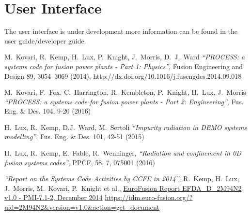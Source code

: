 \documentclass[11pt,a4paper]{article}
\begin{document}
\section{User Interface}

The user interface is under development more information can be found in the user guide/developer guide.

\begin{thebibliography}{99}
  \raggedright

M.\ Kovari, R.\ Kemp, H.\ Lux, P.\ Knight, J.\ Morris, D.\ J.\ Ward
\textit{``PROCESS: a systems code for fusion power plants - Part 1: Physics''},
Fusion Engineering and Design 89, 3054–3069 (2014),
http://dx.doi.org/10.1016/j.fusengdes.2014.09.018

M.~Kovari, F.~Fox, C.~Harrington, R.~Kembleton, P.~Knight, H.~Lux, J.~Morris
\textit{``PROCESS: a systems code for fusion power plants - Part 2: Engineering''}, Fus. Eng. \& Des. 104, 9-20 (2016)

H.~Lux, R.~Kemp, D.J.~Ward, M.~Sertoli
\textit{``Impurity radiation in DEMO systems modelling''},
Fus. Eng. \& Des. 101, 42-51 (2015)

H.~Lux, R.~Kemp, E.~Fable, R.~Wenninger,
\textit{``Radiation and confinement in 0D fusion systems codes''},
 PPCF, 58, 7, 075001 (2016)

\textit{``Report on the Systems Code Activities by CCFE in 2014''},
R.\ Kemp, H.\ Lux, J.\ Morris, M.\ Kovari, P.\ Knight et al.,
\href{https://idm.euro-fusion.org/?uid=2M94N2\&version=v1.0\&action=get\_document}
{EuroFusion Report EFDA\_D\_2M94N2 v1.0 - PMI-7.1-2, December 2014}
\url{https://idm.euro-fusion.org/?uid=2M94N2\&version=v1.0\&action=get\_document}



\end{thebibliography}
\end{document}
